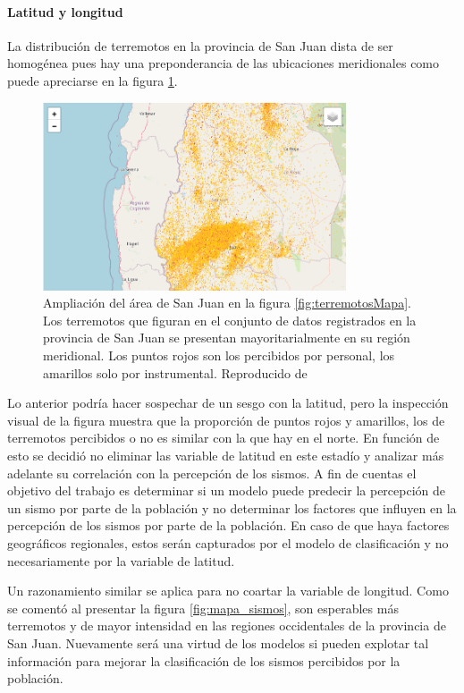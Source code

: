 \documentclass[a4paper]{report}
\begin{document}
\paragraph{Latitud y longitud}
La distribución de terremotos en la provincia de San Juan dista de ser homogénea pues hay una preponderancia de las ubicaciones meridionales como puede apreciarse en la figura \ref{fig:sanJuan}. 
\begin{figure}[!ht]
\centering
\includegraphics[width=0.8\textwidth]{sanJuan.png}
\caption{Ampliación del área de San Juan en la figura \ref{fig:terremotosMapa}.
	Los terremotos que figuran en el conjunto de datos registrados en la provincia de San Juan se presentan mayoritarialmente en su región meridional.
	Los puntos rojos son los percibidos por personal, los amarillos solo por instrumental. 
	Reproducido de \cite{daniela_parada_ic-datasets-docencia_nodate}}
\label{fig:sanJuan}
\end{figure}

Lo anterior podría hacer sospechar de un sesgo con la latitud, pero la inspección visual de la figura muestra que la proporción de puntos rojos y amarillos, los de terremotos percibidos o no es similar con la que hay en el norte.
En función de esto se decidió no eliminar las variable de latitud en este estadío y analizar más adelante su correlación con la percepción de los sismos.
A fin de cuentas el objetivo del trabajo es determinar si un modelo puede predecir la percepción de un sismo por parte de la población y no determinar los factores que influyen en la percepción de los sismos por parte de la población.
En caso de que haya factores geográficos regionales, estos serán capturados por el modelo de clasificación y no necesariamente por la variable de latitud.

Un razonamiento similar se aplica para no coartar la variable de longitud.
Como se comentó al presentar la figura \ref{fig:mapa_sismos}, son esperables más terremotos y de mayor intensidad en las regiones occidentales de la provincia de San Juan.
Nuevamente será una virtud de los modelos si pueden explotar tal información para mejorar la clasificación de los sismos percibidos por la población.
\end{document}
